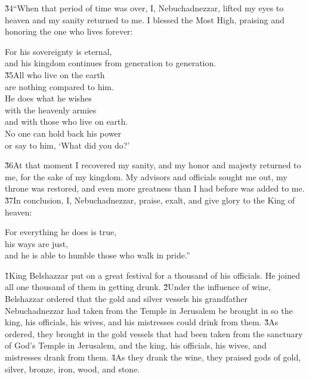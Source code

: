 \v{34}``When that period of time was over, I, Nebuchadnezzar, lifted my eyes to heaven and my sanity returned to me. I blessed the Most High, praising and honoring the one who lives forever:

\begin{poetry}
\poeml For his sovereignty is eternal, \\
\poemll    and his kingdom continues from generation to generation. \\
\poeml \v{35}All who live on the earth \\
\poemll    are nothing compared to him. \\
\poeml He does what he wishes \\
\poemll    with the heavenly armies \\
\poemlll       and with those who live on earth. \\
\poeml No one can hold back his power \\
\poemll    or say to him, `What did you do?'
\end{poetry}

\v{36}At that moment I recovered my sanity, and my honor and majesty returned to me, for the sake of my kingdom. My advisors and officials sought me out, my throne was restored, and even more greatness than I had before was added to me. \v{37}In conclusion, I, Nebuchadnezzar, praise, exalt, and give glory to the King of heaven:

\begin{poetry}
\poeml For everything he does is true, \\
\poemll    his ways are just, \\
\poemlll       and he is able to humble those who walk in pride.''
\end{poetry}

\v{1}King Belshazzar put on a great festival for a thousand of his officials. He joined all one thousand of them in getting drunk. \v{2}Under the influence of wine, Belshazzar ordered that the gold and silver vessels his grandfather Nebuchadnezzar had taken from the Temple in Jerusalem be brought in so the king, his officials, his wives, and his mistresses could drink from them. \v{3}As ordered, they brought in the gold vessels that had been taken from the sanctuary of God's Temple in Jerusalem, and the king, his officials, his wives, and mistresses drank from them. \v{4}As they drank the wine, they praised gods of gold, silver, bronze, iron, wood, and stone.

